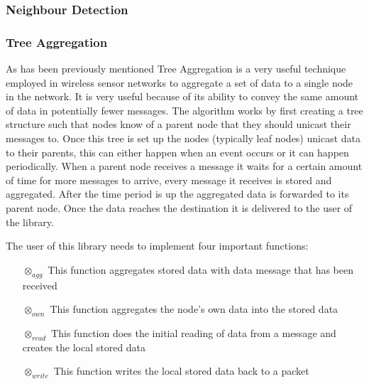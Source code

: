 \subsubsection{Neighbour Detection}

\subsubsection{Tree Aggregation}

As has been previously mentioned Tree Aggregation is a very useful technique employed in wireless sensor networks to aggregate a set of data to a single node in the network. It is very useful because of its ability to convey the same amount of data in potentially fewer messages. The algorithm works by first creating a tree structure such that nodes know of a parent node that they should unicast their messages to. Once this tree is set up the nodes (typically leaf nodes) unicast data to their parents, this can either happen when an event occurs or it can happen periodically. When a parent node receives a message it waits for a certain amount of time for more messages to arrive, every message it receives is stored and aggregated. After the time period is up the aggregated data is forwarded to its parent node. Once the data reaches the destination it is delivered to the user of the library.


The user of this library needs to implement four important functions:
\begin{enumerate}
\item[$\otimes_{agg}$] This function aggregates stored data with data message that has been received
\item[$\otimes_{own}$] This function aggregates the node's own data into the stored data
\item[$\otimes_{read}$] This function does the initial reading of data from a message and creates the local stored data
\item[$\otimes_{write}$] This function writes the local stored data back to a packet
\end{enumerate}


